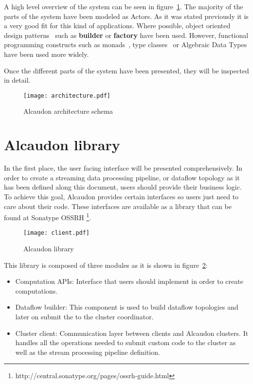 A high level overview of the system can be seen in
figure~\ref{fig:architecture}. The majority of the parts of the system have been
modeled as Actors. As it was stated previously it is a very good fit for this
kind of applications. Where possible, object oriented design patterns~\cite{gof}
such as \textbf{builder} or \textbf{factory} have been used. However, functional
programming constructs such as monads~\cite{monads}, type
classes~\cite{typeclasses} or Algebraic Data Types have been used more widely.

Once the different parts of the system have been presented, they will be
inspected in detail.

\begin{figure}[!h]
  \centering
  \texttt{[image: architecture.pdf]}
  \caption{Alcaudon architecture schema}
  \label{fig:architecture}
\end{figure}

\section{Alcaudon library}

In the first place, the user facing interface will be presented comprehensively. In order
to create a streaming data processing pipeline, or dataflow topology as it has
been defined along this document, users should provide their business
logic. To achieve this goal, Alcaudon provides certain interfaces so users
just need to care about their code. These interfaces are available as a library
that can be found at Sonatype OSSRH \footnote{http://central.sonatype.org/pages/ossrh-guide.html}.

\begin{figure}[!h]
  \centering
  \texttt{[image: client.pdf]}
  \caption{Alcaudon library}
  \label{fig:library}
\end{figure}

This library is composed of three modules as it is shown in figure~\ref{fig:library}:

\begin{itemize}
\item Computation \acs{API}s: Interface that users should implement in order to
  create computations.
\item Dataflow builder: This component is used to build dataflow topologies and
  later on submit the to the cluster coordinator.
\item Cluster client: Communication layer between clients and Alcaudon clusters.
  It handles all the operations needed to submit custom code to the cluster as well
  as the stream processing pipeline definition.
\end{itemize}

